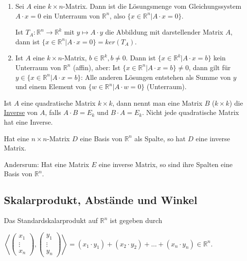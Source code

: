 \documentclass{mg2}
\begin{document}
\begin{proposition}
\begin{enumerate}
\item Sei $A$ eine $k \times n$-Matrix. Dann ist die Lösungsmenge vom Gleichungssystem $A \cdot x = 0$ ein Unterraum von $\mathbb{R}^n$, also $\{ x \in \mathbb{R}^n | A \cdot x = 0 \}$.

Ist $T_A : \mathbb{R}^n \to \mathbb{R}^k$ mit $y \mapsto A \cdot y$ die Abbildung mit darstellender Matrix $A$, dann ist $\{x \in \mathbb{R}^n | A \cdot x = 0\} = ker(T_A)$.
\item Ist $A$ eine $k \times n$-Matrix, $b \in \mathbb{R}^k, b \neq 0$. Dann ist $\{ x \in \mathbb{R}^k | A \cdot x = b \}$ kein Unterraum von $\mathbb{R}^n$ (affin), aber: Ist $\{x \in \mathbb{R}^n | A \cdot x = b \} \neq 0$, dann gilt für $y \in \{x \in \mathbb{R}^n | A \cdot x = b\}$: Alle anderen Lösungen entstehen als Summe von $y$ und einem Element von $\{w \in \mathbb{R}^n | A \cdot w = 0\}$ (Unterraum).
\end{enumerate}
\end{proposition}

\begin{definition}[Inverse]
Ist $A$ eine quadratische Matrix $k \times k$, dann nennt man eine Matrix $B$ ($k \times k$) die \underline{Inverse} von $A$, falls $A \cdot B = E_k$ und $B \cdot A = E_k$. Nicht jede quadratische Matrix hat eine Inverse.
\end{definition}

\begin{satz}
Hat eine $n \times n$-Matrix $D$ eine Basis von $\mathbb{R}^n$ als Spalte, so hat $D$ eine inverse Matrix.
\end{satz}
Andersrum: Hat eine Matrix $E$ eine inverse Matrix, so sind ihre Spalten eine Basis von $\mathbb{R}^n$.

\newpage
\subsection{Skalarprodukt, Abstände und Winkel}

\begin{definition}[Skalarprodukt]
Das Standardskalarprodukt auf $\mathbb{R}^n$ ist gegeben durch 

$\left\langle \begin{pmatrix}x_1\\\vdots\\x_n\end{pmatrix},\begin{pmatrix}y_1\\\vdots\\y_n\end{pmatrix} \right\rangle = (x_1\cdot y_1) + (x_2\cdot y_2) + \dots + (x_n\cdot y_n) \in \mathbb{R}^n$.
\end{definition}
\end{document}
